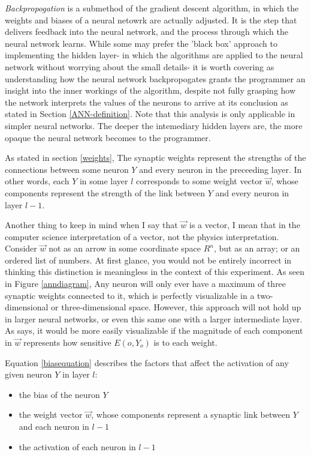 \documentclass[12pt]{article}
\begin{document}
        \textit{Backpropogation} is a submethod of the gradient descent algorithm, in which the weights and biases of a neural netowrk are actually adjusted. It is the step that delivers feedback into the neural network, and the process through which the neural network learns. While some may prefer the 'black box' approach to implementing the hidden layer- in which the algorithms are applied to the neural network without worrying about the small details- it is worth covering as understanding how the neural network backpropogates grants the programmer an insight into the inner workings of the algorithm, despite not fully grasping how the network interprets the values of the neurons to arrive at its conclusion as stated in Section \ref{ANN-definition}. Note that this analysis is only applicable in simpler neural networks. The deeper the intemediary hidden layers are, the more opaque the neural network becomes to the programmer.

        As stated in section \ref{weights}, The synaptic weights represent the strengths of the connections between some neuron $Y$ and every neuron in the preceeding layer. In other words, each $Y$ in some layer $l$ corresponds to some weight vector $\vec w$, whose components represent the strength of the link between $Y$ and every neuron in layer $l-1$.

        Another thing to keep in mind when I say that $\vec w$ is a vector, I mean that in the computer science interpretation of a vector, not the physics interpretation. Consider $\vec{w}$ not as an arrow in some coordinate space $R^n$, but as an array; or an ordered list of numbers. At first glance, you would not be entirely incorrect in thinking this distinction is meaningless in the context of this experiment. As seen in Figure \ref{anndiagram}, Any neuron will only ever have a maximum of three synaptic weights connected to it, which is perfectly visualizable in a two-dimensional or three-dimensional space. However, this approach will not hold up in larger neural networks, or even this same one with a larger intermediate layer. As \textcite{DeepLearningCh3} says, it would be more easily visualizable if the magnitude of each component in $\vec w$ represents how sensitive $E(o, Y_o)$ is to each weight.

        Equation \ref{biasequation} describes the factors that affect the activation of any given neuron $Y$ in layer $l$:

        \begin{itemize}
            \item the bias of the neuron $Y$
            \item the weight vector $\vec{w}$, whose components represent a synaptic link  between $Y$ and each neuron in $l - 1$
            \item the activation of each neuron in $l - 1$
        \end{itemize}
\end{document}
